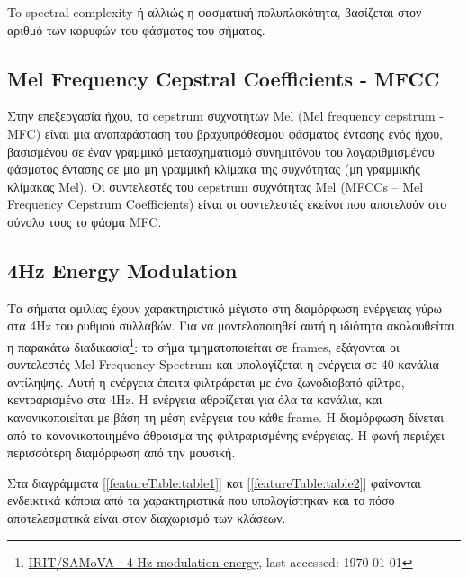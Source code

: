To spectral complexity ή αλλιώς η φασματική πολυπλοκότητα, βασίζεται στον αριθμό των κορυφών του φάσματος του σήματος.

\subsection{Mel Frequency Cepstral Coefficients - MFCC}

Στην επεξεργασία ήχου, το cepstrum συχνοτήτων Mel (Μel frequency cepstrum - MFC) είναι μια αναπαράσταση του βραχυπρόθεσμου φάσματος έντασης ενός ήχου, βασισμένου σε έναν γραμμικό μετασχηματισμό συνημιτόνου του λογαριθμισμένου φάσματος έντασης σε μια μη γραμμική κλίμακα της συχνότητας (μη γραμμικής κλίμακας Mel).  Οι συντελεστές του cepstrum συχνότητας Mel (MFCCs – Mel Frequency Cepstrum Coefficients) είναι οι συντελεστές εκείνοι που αποτελούν στο σύνολο τους το φάσμα MFC.

\subsection{4Hz Energy Modulation}

Τα σήματα ομιλίας έχουν χαρακτηριστικό μέγιστο στη διαμόρφωση ενέργειας γύρω στα 4Hz του ρυθμού συλλαβών. Για να μοντελοποιηθεί αυτή η ιδιότητα ακολουθείται η παρακάτω διαδικασία\footnote{\href{https://www.irit.fr/recherches/SAMOVA/FeaturesExtraction.html\#me4hz}{IRIT/SAMoVA - 4 Hz modulation energy}, last accessed: \today}: το σήμα τμηματοποιείται σε frames, εξάγονται οι συντελεστές Mel Frequency Spectrum και υπολογίζεται η ενέργεια σε 40 κανάλια αντίληψης. Αυτή η ενέργεια έπειτα φιλτράρεται με ένα ζωνοδιαβατό φίλτρο, κεντραρισμένο στα 4Hz. Η ενέργεια αθροίζεται για όλα τα κανάλια, και κανονικοποιείται με βάση τη μέση ενέργεια του κάθε frame. Η διαμόρφωση δίνεται από το κανονικοποιημένο άθροισμα της φιλτραρισμένης ενέργειας. Η φωνή περιέχει περισσότερη διαμόρφωση από την μουσική.

\vspace{1em}
Στα διαγράμματα [\ref{featureTable:table1}] και [\ref{featureTable:table2}] φαίνονται ενδεικτικά κάποια από τα χαρακτηριστικά που υπολογίστηκαν και το πόσο αποτελεσματικά είναι στον διαχωρισμό των κλάσεων.

